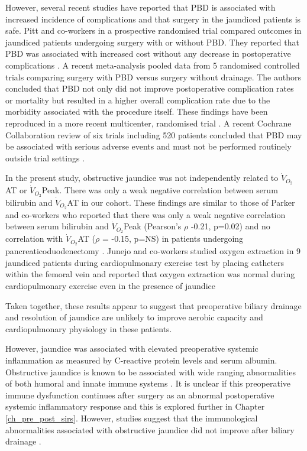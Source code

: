 However, several recent studies have reported that PBD is associated with increased incidence of complications and that surgery in the jaundiced patients is safe.
Pitt and co-workers in a prospective randomised trial compared outcomes in jaundiced patients undergoing surgery with or without PBD. They reported that PBD was associated with increased cost without any decrease in postoperative complications \parencite{pitt_does_1985}. 
A recent meta-analysis \parencite{sewnath_meta-analysis_2002} pooled data from 5 randomised controlled trials comparing surgery with PBD versus surgery without drainage.
The authors concluded that PBD not only did not improve postoperative complication rates or mortality but resulted in a higher overall complication rate due to the morbidity associated with the procedure itself. 
These findings have been reproduced in a more recent multicenter, randomised trial \parencite{van_der_gaag_preoperative_2010}.
A recent Cochrane Collaboration review of six trials including 520 patients concluded that PBD may be associated with serious adverse events and must not be performed routinely outside trial settings \parencite{wang_preoperative_2008}.

In the present study, obstructive jaundice was not independently related to $\dot{V}_{O_2}$AT or $\dot{V}_{O_2}$Peak.
There was only a weak negative correlation between serum bilirubin and $\dot{V}_{O_2}$AT in our cohort.
These findings are similar to those of Parker and co-workers who reported that there was only a weak negative correlation between serum bilirubin and  $\dot{V}_{O_2}$Peak (Pearson's $\rho$ -0.21, p=0.02) and no correlation with $\dot{V}_{O_2}$AT ($\rho$ = -0.15, p=NS) in patients undergoing pancreaticoduodenectomy \parencite{parker_serum_2014}. 
Junejo and co-workers studied oxygen extraction in 9 jaundiced patients during cardiopulmonary exercise test by placing catheters within the femoral vein and reported that oxygen extraction was normal during cardiopulmonary exercise even in the presence of jaundice \parencite{junejo_peripheral_2014}

Taken together, these results appear to suggest that preoperative biliary drainage and resolution of jaundice are unlikely to improve aerobic capacity and cardiopulmonary physiology in these patients.

However, jaundice was associated with elevated preoperative systemic inflammation as measured by C-reactive protein levels and serum albumin. 
Obstructive jaundice is known to be associated with wide ranging abnormalities of both humoral and innate immune systems \parencite{nehez_compromise_2002, padillo_cytokines_2001, scott-conner_pathophysiology_1994}. 
It is unclear if this preoperative immune dysfunction continues after surgery as an abnormal postoperative systemic inflammatory response and this is explored further in Chapter \ref{ch_pre_post_sirs}.
However, studies suggest that the immunological abnormalities associated with obstructive jaundice did not improve after biliary drainage \parencite{kimmings_endotoxin_2000}.

